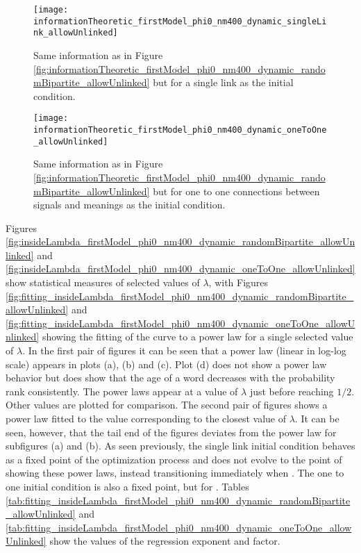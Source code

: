\begin{figure}
  \centering
  \texttt{[image: informationTheoretic\_firstModel\_phi0\_nm400\_dynamic\_singleLink\_allowUnlinked]}
  \caption{Same information as in Figure \ref{fig:informationTheoretic_firstModel_phi0_nm400_dynamic_randomBipartite_allowUnlinked} but for a single link as the initial condition.}
  \label{fig:informationTheoretic_firstModel_phi0_nm400_dynamic_singleLink_allowUnlinked}
\end{figure}

\begin{figure}
  \centering
  \texttt{[image: informationTheoretic\_firstModel\_phi0\_nm400\_dynamic\_oneToOne\_allowUnlinked]}
  \caption{Same information as in Figure \ref{fig:informationTheoretic_firstModel_phi0_nm400_dynamic_randomBipartite_allowUnlinked} but for one to one connections between signals and meanings as the initial condition.}
  \label{fig:informationTheoretic_firstModel_phi0_nm400_dynamic_oneToOne_allowUnlinked}
\end{figure}

Figures \ref{fig:insideLambda_firstModel_phi0_nm400_dynamic_randomBipartite_allowUnlinked} and \ref{fig:insideLambda_firstModel_phi0_nm400_dynamic_oneToOne_allowUnlinked} show statistical measures of selected values of $\lambda$, with Figures \ref{fig:fitting_insideLambda_firstModel_phi0_nm400_dynamic_randomBipartite_allowUnlinked} and \ref{fig:fitting_insideLambda_firstModel_phi0_nm400_dynamic_oneToOne_allowUnlinked} showing the fitting of the curve to a power law for a single selected value of $\lambda$.
In the first pair of figures it can be seen that a power law (linear in log-log scale) appears in plots (a), (b) and (c).
Plot (d) does not show a power law behavior but does show that the age of a word decreases with the probability rank consistently.
The power laws appear at a value of $\lambda$ just before reaching $1/2$.
Other values are plotted for comparison.
The second pair of figures shows a power law fitted to the value corresponding to the closest value of $\lambda$.
It can be seen, however, that the tail end of the figures deviates from the power law for subfigures (a) and (b).
As seen previously, the single link initial condition behaves as a fixed point of the optimization process and does not evolve to the point of showing these power laws, instead transitioning immediately when \lambdaHalfToOne{}.
The one to one initial condition is also a fixed point, but for \lambdaHalfToOne{}.
Tables \ref{tab:fitting_insideLambda_firstModel_phi0_nm400_dynamic_randomBipartite_allowUnlinked} and \ref{tab:fitting_insideLambda_firstModel_phi0_nm400_dynamic_oneToOne_allowUnlinked} show the values of the regression exponent and factor.

